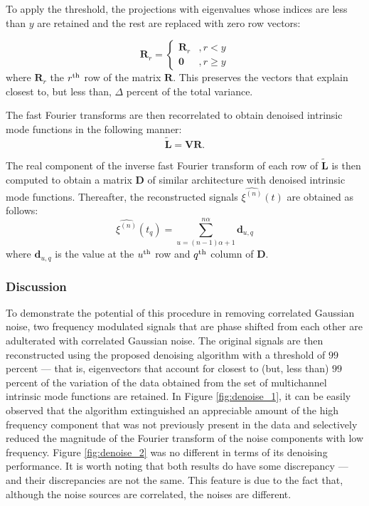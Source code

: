 \documentclass[onecolumn, groupedaddress, 10pt]{revtex4-1}
\begin{document}
To apply the threshold, the projections with eigenvalues whose indices are less than $y$ are retained and the rest are replaced with zero row vectors:

\begin{displaymath}
   \mathbf{R}_r = \left\{
     \begin{array}{lr}
        \mathbf{R}_r & , r < y     \\
       \mathbf{0} & , r \geq y
     \end{array}
   \right.
\end{displaymath}
where $\mathbf{R}_r$ the $r^{\textnormal{th}}$ row of the matrix $\mathbf{R}$. This preserves the vectors that explain closest to, but less than, $\Delta$ percent of the total variance.

The fast Fourier transforms are then recorrelated to obtain denoised intrinsic mode functions in the following manner:
\begin{equation}
\tilde{ \mathbf{L} } = \mathbf{V}\mathbf{R}.
\end{equation}

The real component of the inverse fast Fourier transform of each row of $\mathbf{\tilde{L}}$ is then computed to obtain a matrix $\mathbf{D}$ of similar architecture with denoised intrinsic mode functions. Thereafter, the reconstructed signals $\hat{\xi^{(n)}}(t)$ are obtained as follows:
\begin{equation}
\hat{\xi^{(n)}}(t_{q}) = \sum_{u = (n-1)\alpha + 1}^{n\alpha} \mathbf{d}_{u,q}
\end{equation}
where $\mathbf{d}_{u,q}$ is the value at the $u^\textnormal{th}$ row and $q^\textnormal{th}$ column of $\textbf{D}$.

\subsubsection{Discussion}
To demonstrate the potential of this procedure in removing correlated Gaussian noise, two frequency modulated signals that are phase shifted from each other are adulterated with correlated Gaussian noise. The original signals are then reconstructed using the proposed denoising algorithm with a threshold of $99$ percent --- that is, eigenvectors that account for closest to (but, less than) $99$ percent of the variation of the data obtained from the set of multichannel intrinsic mode functions are retained. In Figure \ref{fig:denoise_1}, it can be easily observed that the algorithm extinguished an appreciable amount of the high frequency component that was not previously present in the data and selectively reduced the magnitude of the Fourier transform of the noise components with low frequency. Figure \ref{fig:denoise_2} was no different in terms of its denoising performance. It is worth noting that both results do have some discrepancy --- and their discrepancies are not the same. This feature is due to the fact that, although the noise sources are correlated, the noises are different.
\end{document}
